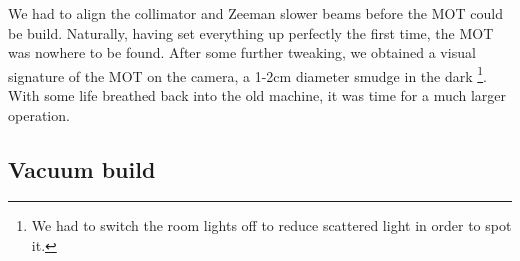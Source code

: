 	We had to align the collimator and Zeeman slower beams before the MOT could be build.
	Naturally, having set everything up perfectly the first time, the MOT was nowhere to be found.
	After some further tweaking, we obtained a visual signature of the MOT on the camera, a 1-2cm diameter smudge in the dark \footnote{We had to switch the room lights off to reduce scattered light in order to spot it.}.
	With some life breathed back into the old machine, it was time for a much larger operation.
	


\subsection{Vacuum build}


